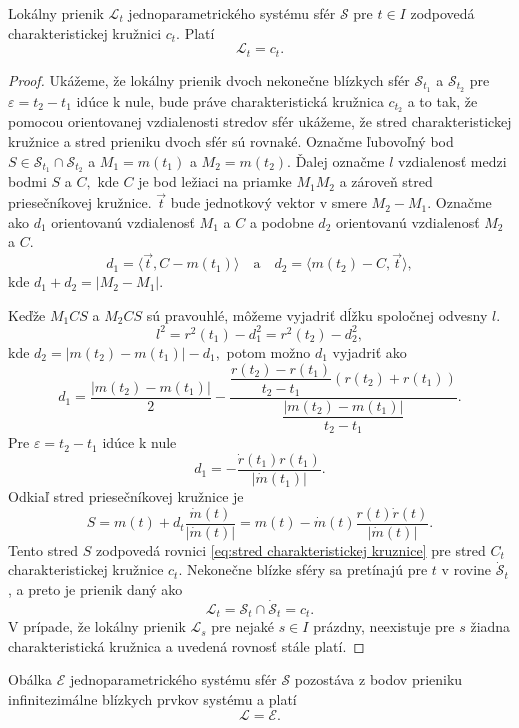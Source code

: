 \begin{lemma} \label{lema o lokalnom prieniku sfer}
Lokálny prienik $\mathcal{L}_{t}$ jednoparametrického systému sfér $\mathcal{S}$ pre $t \in I$ zodpovedá charakteristickej kružnici $c_{t}$. Platí $$
\mathcal{L}_{t} = c_{t}.
$$
\end{lemma}

\begin{proof}
Ukážeme, že lokálny prienik dvoch nekonečne blízkych sfér $\mathcal{S}_{t_1}$ a $\mathcal{S}_{t_2}$ pre $\varepsilon = t_2 - t_1$ idúce k nule, bude práve charakteristická kružnica $c_{t_2}$ a to tak, že pomocou orientovanej vzdialenosti stredov sfér ukážeme, že stred charakteristickej kružnice a stred prieniku dvoch sfér sú rovnaké.
Označme ľubovoľný bod $S \in \mathcal{S}_{t_1} \cap \mathcal{S}_{t_2}$ a $M_1 = m(t_1) $ a $M_2 = m(t_2).$ Ďalej označme $l$ vzdialenosť medzi bodmi $S$ a $C,$ kde $C$ je bod ležiaci na priamke $M_1M_2$ a zároveň stred priesečníkovej kružnice. $\vec{t} $ bude jednotkový vektor v smere $ M_2 - M_1.$
Označme ako $d_1$ orientovanú vzdialenosť $M_1$ a $C$ a podobne $d_2$ orientovanú vzdialenosť $M_2$ a $C.$
$$ d_1 = \langle \vec{t}, C - m(t_1) \rangle \quad \text{a} \quad d_2 = \langle m(t_2) - C,  \vec{t} \rangle, $$
kde $d_1 + d_2 = | M_2 - M_1 |.$

 Keďže $M_1CS$ a $M_2CS$ sú pravouhlé, môžeme vyjadriť dĺžku spoločnej odvesny $l.$
$$l^2 = r^2(t_1) - d^2_1 = r^2(t_2) - d^2_2,$$
kde $d_2 = |m(t_2) - m(t_1)| - d_1, $
potom možno $d_1$ vyjadriť ako 
$$d_1 = \dfrac{ | m(t_2) - m(t_1) |}{2} - \dfrac{\dfrac{r(t_2)-r(t_1)}{t_2-t_1} (r(t_2) +r(t_1))}{\dfrac{ | m(t_2)-m(t_1) |}{t_2 - t_1}}.$$
Pre $\varepsilon = t_2 - t_1 $ idúce k nule
$$ d_1 = - \dfrac{\dot{r}(t_1) r(t_1)}{| \dot{m}(t_1) |}.  $$
Odkiaľ stred priesečníkovej kružnice je
$$S = m(t) + d_t \dfrac{\dot{m}(t)}{| \dot{m}(t)|} = m(t) - \dot{m}(t)\dfrac{r(t)\dot{r}(t)}{|\dot{m}(t)|}. $$
Tento stred $S$ zodpovedá rovnici \ref{eq:stred charakteristickej kruznice} pre stred $C_t$ charakteristickej kružnice $c_t$. Nekonečne blízke sféry sa pretínajú pre $t$ v rovine $\mathcal{\dot{S}}_{t}$, a preto je prienik daný ako 
$$ \mathcal{L}_{t} = \mathcal{S}_{t} \cap \mathcal{\dot{S}}_{t} = c_{t}. $$
V prípade, že lokálny prienik $\mathcal{L}_{s}$ pre nejaké $s \in I$ prázdny, neexistuje pre $s$ žiadna charakteristická kružnica a uvedená rovnosť stále platí.
\end{proof}

\begin{theorem}
Obálka $\mathcal{E}$ jednoparametrického systému sfér $\mathcal{S}$ pozostáva z bodov prieniku infinitezimálne blízkych prvkov systému a platí $$
\mathcal{L} = \mathcal{E}.
$$
\end{theorem}

